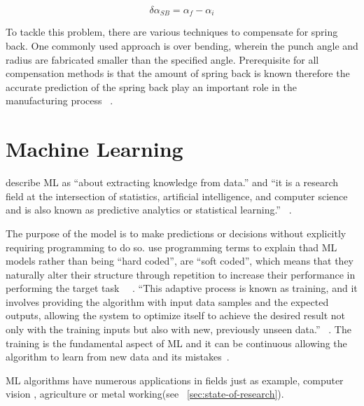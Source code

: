 \begin{tcolorbox}[arc=0pt,boxrule=0.5pt]
    \begin{equation}
        \delta \alpha_{SB} = \alpha_f - \alpha_i
        \label{eq:calculation_springback}
    \end{equation}
\end{tcolorbox}

To tackle this problem, there are various techniques to compensate for spring back.
One commonly used approach is over bending, wherein the punch angle and radius are fabricated smaller than the
specified angle.
Prerequisite for all compensation methods is that the amount of spring back is known therefore
the accurate prediction of the spring back play an important role in the manufacturing
process ~\cite[p. 114]{groover2020fundamentals}.


\section{Machine Learning}\label{sec:machine-learning}
\cite{muller2016introduction} describe \ac{ML} as ``about extracting
knowledge from data.'' and ``it is a research field at the intersection of statistics, artificial intelligence, and
computer science and is also known as predictive analytics or statistical learning.''
~\cite[p. 1]{muller2016introduction}.

The purpose of the model is to make predictions or decisions without explicitly requiring programming to do so.
\cite{el2015machine} use programming terms to explain thad ML models rather than being ``hard coded'', are ``soft
coded'', which means that they naturally alter their structure through repetition to increase their performance in
performing the target task ~\cite[pp. 4]{el2015machine}~\cite[pp. 151--170]{koza1996automated}.
``This adaptive process is known as training, and it involves providing the algorithm with input data samples and the
expected outputs, allowing the system to optimize itself to achieve the desired result not only with the training
inputs but also with new, previously unseen data.''
~\cite[pp. 4]{el2015machine}.
The training is the fundamental aspect of \ac{ML} and it can be continuous allowing the algorithm to
learn from new data and its mistakes~\cite[pp. 4]{el2015machine}.

\ac{ML} algorithms have numerous applications in fields just as example, computer vision \cite[]{hu2020voronoi},
agriculture \cite[]{yoosefzadeh2021application}
or metal working(see ~\cref{sec:state-of-research}).


